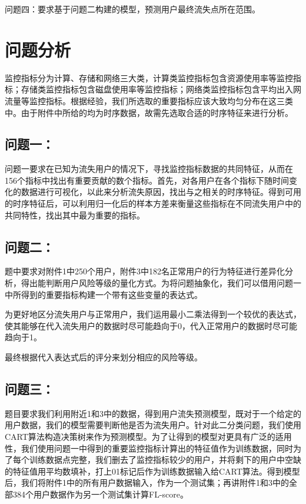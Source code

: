 \documentclass{ctexart}
\begin{document}
    问题四：要求基于问题二构建的模型，预测用户最终流失点所在范围。

    \section{问题分析}
    监控指标分为计算、存储和网络三大类，计算类监控指标包含资源使用率等监控指标；存储类监控指标包含磁盘使用率等监控指标；网络类监控指标包含平均出入网流量等监控指标。根据经验，我们所选取的重要指标应该大致均匀分布在这三类中。由于附件中所给的均为时序数据，故需先选取合适的时序特征来进行分析。

    \subsection{问题一：}问题一要求在已知为流失用户的情况下，寻找监控指标数据的共同特征，从而在156个指标中找出有重要贡献的数个指标。首先，对各用户在各个指标下随时间变化的数据进行可视化，以此来分析流失原因，找出与之相关的时序特征。得到可用的时序特征后，可以利用归一化后的样本方差来衡量这些指标在不同流失用户中的共同特性，找出其中最为重要的指标。

        \subsection{问题二：} 题中要求对附件1中250个用户，附件3中182名正常用户的行为特征进行差异化分析，得出能判断用户风险等级的量化方式。为将问题抽象化，我们可以借用问题一中所得到的重要指标构建一个带有这些变量的表达式。

        为更好地区分流失用户与正常用户，我们运用最小二乘法得到一个较优的表达式，使其能够在代入流失用户的数据时尽可能趋向于0，代入正常用户的数据时尽可能趋向于1。

        最终根据代入表达式后的评分来划分相应的风险等级。

	    	
        \subsection{问题三：} 题目要求我们利用附近1和3中的数据，得到用户流失预测模型，既对于一个给定的用户数据，我们的模型需要判断他是否为流失用户。针对此二分类问题，我们使用CART算法构造决策树来作为预测模型。为了让得到的模型对更具有广泛的适用性，我们使用问题一中得到的重要监控指标计算出的特征值作为训练数据，同时为了每个训练数据点完整，我们删去了监控指标较少的用户，并将剩下的用户中空缺的特征值用平均数填补，打上01标记后作为训练数据输入给CART算法。得到模型后，我们将附件1中的所有用户数据输入，作为一个测试集；再讲附件1和3中的全部384个用户数据作为另一个测试集计算FL-score。
        
\end{document}
